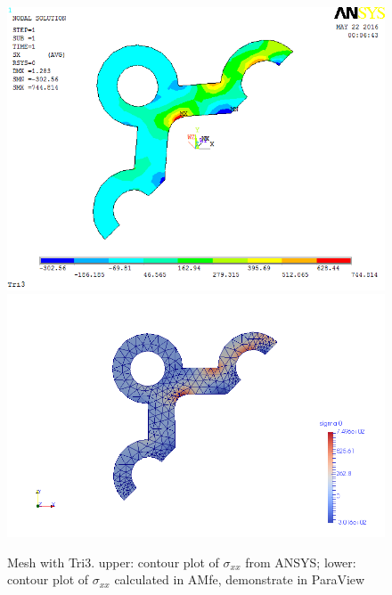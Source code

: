 \begin{figure}[htbp]
	\begin{center}
		\includegraphics[width=13cm,clip]{TTri3_Sxx.png} 		
		\includegraphics[width=13cm,clip]{TTri3_Sxx_P.png} 		
		\caption{Mesh with Tri3. upper: contour plot of $\sigma_{xx}$ from ANSYS; lower: contour plot of $\sigma_{xx}$ calculated in AMfe, demonstrate in ParaView} \label{fig: Tri3_Sxx}
	\end{center}
\end{figure}
\clearpage 

